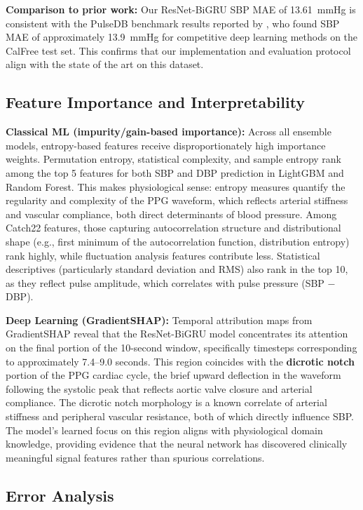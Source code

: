 \documentclass[11pt]{article}
\begin{document}
\textbf{Comparison to prior work:} Our ResNet-BiGRU SBP MAE of 13.61~mmHg is consistent with the PulseDB benchmark results reported by \citet{moulaeifard2025pulsedb}, who found SBP MAE of approximately 13.9~mmHg for competitive deep learning methods on the CalFree test set. This confirms that our implementation and evaluation protocol align with the state of the art on this dataset.

\subsection{Feature Importance and Interpretability}

\textbf{Classical ML (impurity/gain-based importance):} Across all ensemble models, entropy-based features receive disproportionately high importance weights. Permutation entropy, statistical complexity, and sample entropy rank among the top 5 features for both SBP and DBP prediction in LightGBM and Random Forest. This makes physiological sense: entropy measures quantify the regularity and complexity of the PPG waveform, which reflects arterial stiffness and vascular compliance, both direct determinants of blood pressure. Among Catch22 features, those capturing autocorrelation structure and distributional shape (e.g., first minimum of the autocorrelation function, distribution entropy) rank highly, while fluctuation analysis features contribute less. Statistical descriptives (particularly standard deviation and RMS) also rank in the top 10, as they reflect pulse amplitude, which correlates with pulse pressure (SBP $-$ DBP).

\textbf{Deep Learning (GradientSHAP):} Temporal attribution maps from GradientSHAP reveal that the ResNet-BiGRU model concentrates its attention on the final portion of the 10-second window, specifically timesteps corresponding to approximately 7.4--9.0 seconds. This region coincides with the \textbf{dicrotic notch} portion of the PPG cardiac cycle, the brief upward deflection in the waveform following the systolic peak that reflects aortic valve closure and arterial compliance. The dicrotic notch morphology is a known correlate of arterial stiffness and peripheral vascular resistance, both of which directly influence SBP. The model's learned focus on this region aligns with physiological domain knowledge, providing evidence that the neural network has discovered clinically meaningful signal features rather than spurious correlations.

\subsection{Error Analysis}
\end{document}
